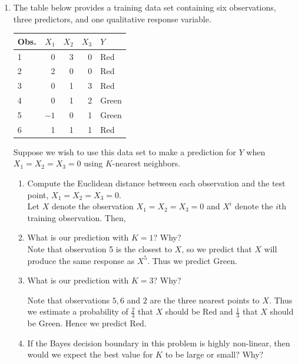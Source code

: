 \documentclass[11pt]{article}
\providecommand{\norm}[1]{\lvert\lvert#1\rvert\lvert}
\begin{document}
\begin{enumerate}
\item The table below provides a training data set containing six observations, three predictors, and one qualitative response variable.

\begin{center}
    \begin{tabular}{l|rrrl}
      \hline
      Obs. & $X_1$ & $X_2$ & $X_3$ & $Y$\\
      \hline
       1 &  0 & 3 & 0 & Red\\
       2 &  2 & 0 & 0 & Red\\
       3 &  0 & 1 & 3 & Red\\
       4 &  0 & 1 & 2 & Green\\
       5 & $-1$ & 0 & 1 & Green\\
       6 &  1 & 1 & 1 & Red\\
       \hline
    \end{tabular}
\end{center}

Suppose we wish to use this data set to make a prediction for $Y$ when $X_1=X_2=X_3=0$ using $K$-nearest neighbors.
\begin{enumerate}
\item Compute the Euclidean distance between each observation and the test point, $X_1=X_2=X_3=0$.\\

Let $X$ denote the observation $X_1=X_2=X_3=0$ and $X^i$ denote the $i$th training observation.  Then,

\item What is our prediction with $K=1$? Why?\\

Note that observation 5 is the closest to $X$, so we predict that $X$ will produce the same response as $X^5$.  Thus we predict Green.
\item What is our prediction with $K=3$? Why?

Note that observations $5, 6$ and $2$ are the three nearest points to $X$.  Thus we estimate a probability of $\frac{2}{3}$ that $X$ should be Red and $\frac{1}{3}$ that $X$ should be Green.  Hence we predict Red.
\item If the Bayes decision boundary in this problem is highly non-linear, then would we expect the best value for $K$ to be large or small? Why?\\


\end{enumerate}
\end{enumerate}
\end{document}
